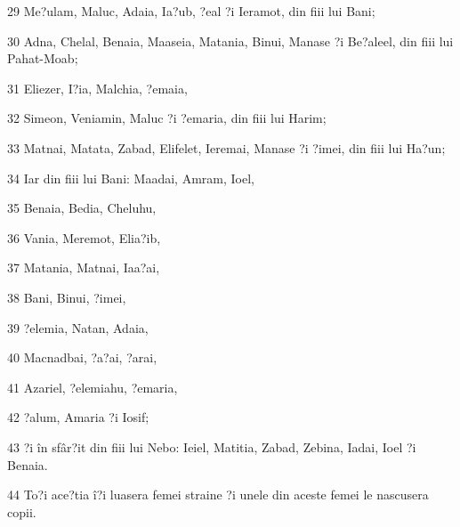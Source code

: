 \par 29 Me?ulam, Maluc, Adaia, Ia?ub, ?eal ?i Ieramot, din fiii lui Bani;
\par 30 Adna, Chelal, Benaia, Maaseia, Matania, Binui, Manase ?i Be?aleel, din fiii lui Pahat-Moab;
\par 31 Eliezer, I?ia, Malchia, ?emaia,
\par 32 Simeon, Veniamin, Maluc ?i ?emaria, din fiii lui Harim;
\par 33 Matnai, Matata, Zabad, Elifelet, Ieremai, Manase ?i ?imei, din fiii lui Ha?un;
\par 34 Iar din fiii lui Bani: Maadai, Amram, Ioel,
\par 35 Benaia, Bedia, Cheluhu,
\par 36 Vania, Meremot, Elia?ib,
\par 37 Matania, Matnai, Iaa?ai,
\par 38 Bani, Binui, ?imei,
\par 39 ?elemia, Natan, Adaia,
\par 40 Macnadbai, ?a?ai, ?arai,
\par 41 Azariel, ?elemiahu, ?emaria,
\par 42 ?alum, Amaria ?i Iosif;
\par 43 ?i în sfâr?it din fiii lui Nebo: Ieiel, Matitia, Zabad, Zebina, Iadai, Ioel ?i Benaia.
\par 44 To?i ace?tia î?i luasera femei straine ?i unele din aceste femei le nascusera copii.


